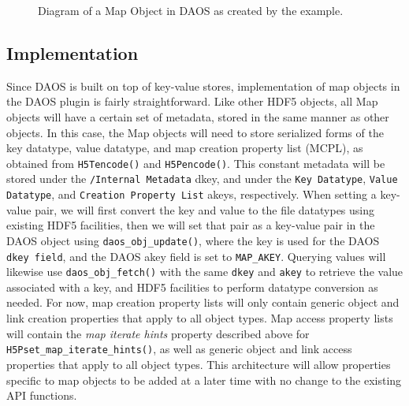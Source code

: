 \begin{figure}
\caption{Diagram of a Map Object in DAOS as created by the example.}
\label{fig:map}
\end{figure}

\subsection{Implementation}

Since DAOS is built on top of key-value stores, implementation of map objects in the DAOS plugin is fairly straightforward. Like other HDF5 objects, all Map objects will have a certain set of metadata, stored in the same manner as other objects. In this case, the Map objects will need to store serialized forms of the key datatype, value datatype, and map creation property list (MCPL), as obtained from \verb+H5Tencode()+ and \verb+H5Pencode()+. This constant metadata will be stored under the \verb+/Internal Metadata+ dkey, and under the \verb+Key Datatype+, \verb+Value Datatype+, and \verb+Creation Property List+ akeys, respectively.
When setting a key-value pair, we will first convert the key and value to the file datatypes using existing HDF5 facilities, then we will set that pair as a key-value pair in the DAOS object using \verb+daos_obj_update()+, where the key is used for the DAOS \verb+dkey field+, and the DAOS akey field is set to \verb+MAP_AKEY+. Querying values will likewise use \verb+daos_obj_fetch()+ with the same \verb+dkey+ and \verb+akey+ to retrieve the value associated with a key, and HDF5 facilities to perform datatype conversion as needed.
For now, map creation property lists will only contain generic object and link creation properties that apply to all object types. Map access property lists will contain the \textit{map iterate hints} property described above for \verb+H5Pset_map_iterate_hints()+, as well as generic object and link access properties that apply to all object types. This architecture will allow properties specific to map objects to be added at a later time with no change to the existing API functions.

